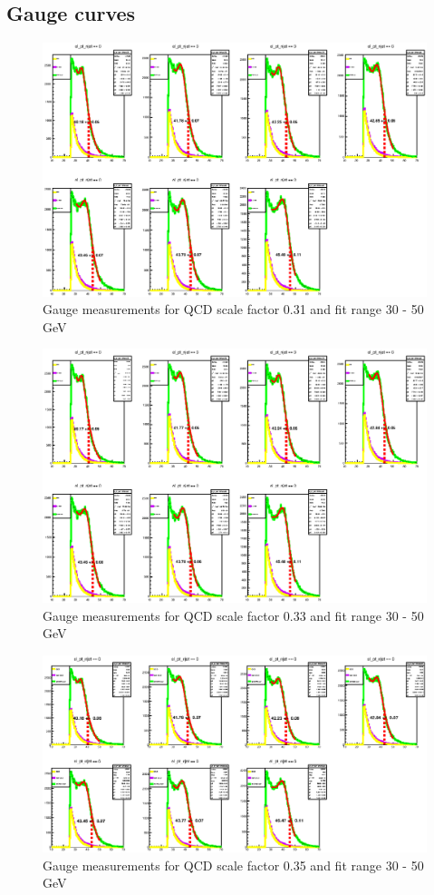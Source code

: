 
\subsection{Gauge curves}
\begin{figure}
\centering
\includegraphics[width=\textwidth]{data/img/gauge_031.eps}
\caption{Gauge measurements for QCD scale factor 0.31 and fit range 30 - 50 GeV}
\end{figure}
\begin{figure}
\centering
\includegraphics[width=\textwidth]{data/img/gauge_033.eps}
\caption{Gauge measurements for QCD scale factor 0.33 and fit range 30 - 50 GeV}
\end{figure}
\begin{figure}
\centering
\includegraphics[width=\textwidth]{data/img/gauge_035.eps}
\caption{Gauge measurements for QCD scale factor 0.35 and fit range 30 - 50 GeV}
\end{figure}
